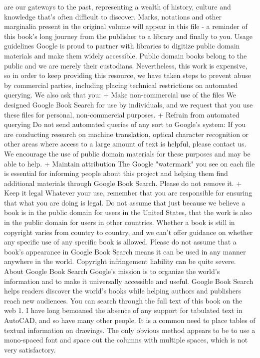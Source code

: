 \documentclass[a4paper]{article}
\begin{document}
are our gateways to the past, representing a wealth of history, culture and knowledge that's often difficult to discover. 
Marks, notations and other marginalia present in the original volume will appear in this file - a reminder of this book's long journey from the 
publisher to a library and finally to you. 
Usage guidelines 
Google is proud to partner with libraries to digitize public domain materials and make them widely accessible. Public domain books belong to the 
public and we are merely their custodians. Nevertheless, this work is expensive, so in order to keep providing this resource, we have taken steps to 
prevent abuse by commercial parties, including placing technical restrictions on automated querying. 
We also ask that you: 
+ Make non-commercial use of the files We designed Google Book Search for use by individuals, and we request that you use these files for 
personal, non-commercial purposes. 
+ Refrain from automated querying Do not send automated queries of any sort to Google's system: If you are conducting research on machine 
translation, optical character recognition or other areas where access to a large amount of text is helpful, please contact us. We encourage the 
use of public domain materials for these purposes and may be able to help. 
+ Maintain attribution The Google "watermark" you see on each file is essential for informing people about this project and helping them find 
additional materials through Google Book Search. Please do not remove it. 
+ Keep it legal Whatever your use, remember that you are responsible for ensuring that what you are doing is legal. Do not assume that just 
because we believe a book is in the public domain for users in the United States, that the work is also in the public domain for users in other 
countries. Whether a book is still in copyright varies from country to country, and we can't offer guidance on whether any specific use of 
any specific book is allowed. Please do not assume that a book's appearance in Google Book Search means it can be used in any manner 
anywhere in the world. Copyright infringement liability can be quite severe. 
About Google Book Search 
Google's mission is to organize the world's information and to make it universally accessible and useful. Google Book Search helps readers 
discover the world's books while helping authors and publishers reach new audiences. You can search through the full text of this book on the web 1. I have long bemoaned the absence of any support for tabulated text in AutoCAD, and so have many other people. It is a common need to place tables of textual information on drawings. The only obvious method appears to be to use a mono-spaced font and space out the columns with multiple spaces, which is not very satisfactory.
\end{document}
